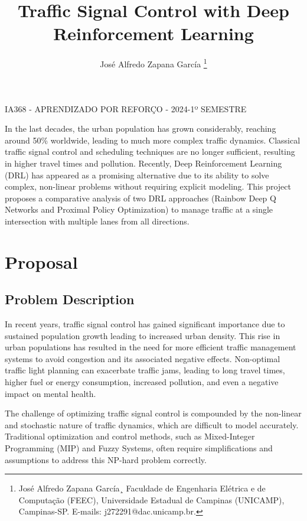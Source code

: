 \documentclass{Supervised_Reinforcement_Learningqsport}
\begin{document}
\title{Traffic Signal Control with Deep Reinforcement Learning}

\author{José Alfredo Zapana García
\thanks{José Alfredo Zapana García¸
Faculdade de Engenharia Elétrica e de Computação (FEEC), Universidade Estadual de Campinas (UNICAMP), Campinas-SP. E-mails: j272291@dac.unicamp.br.}}

\maketitle

 {IA368 - APRENDIZADO POR REFORÇO - 2024-1º SEMESTRE}

\begin{resumo}
In the last decades, the urban population has grown considerably, reaching around 50\% worldwide, leading to much more complex traffic dynamics. Classical traffic signal control and scheduling techniques are no longer sufficient, resulting in higher travel times and pollution. Recently, Deep Reinforcement Learning (DRL) has appeared as a promising alternative due to its ability to solve complex, non-linear problems without requiring explicit modeling. This project proposes a comparative analysis of two DRL approaches (Rainbow Deep Q Networks and Proximal Policy Optimization) to manage traffic at a single intersection with multiple lanes from all directions. 
\end{resumo}

\section{Proposal}

\subsection{Problem Description}

In recent years, traffic signal control has gained significant importance due to sustained population growth leading to increased urban density. This rise in urban populations has resulted in the need for more efficient traffic management systems to avoid congestion and its associated negative effects. Non-optimal traffic light planning can exacerbate traffic jams, leading to long travel times, higher fuel or energy consumption, increased pollution, and even a negative impact on mental health.

The challenge of optimizing traffic signal control is compounded by the non-linear and stochastic nature of traffic dynamics, which are difficult to model accurately. Traditional optimization and control methods, such as Mixed-Integer Programming (MIP) and Fuzzy Systems, often require simplifications and assumptions to address this NP-hard problem correctly.
\end{document}
